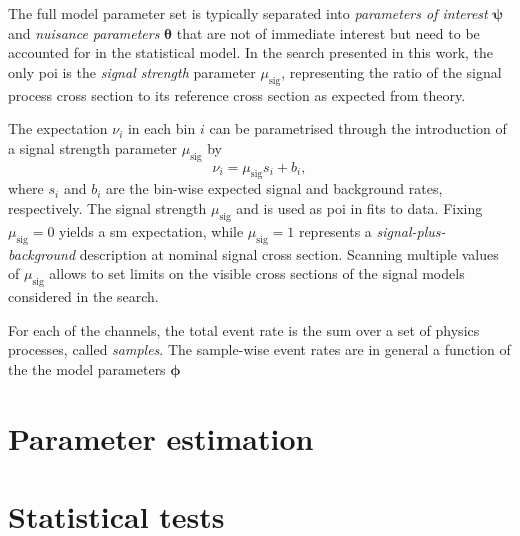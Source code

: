 


 The full model parameter set is typically separated into \textit{parameters of interest} $\boldsymbol{\psi}$ and \textit{nuisance parameters} $\boldsymbol{\theta}$ that are not of immediate interest but need to be accounted for in the statistical model. In the search presented in this work, the only \gls{poi} is the \textit{signal strength} parameter $\mu_{\mathrm{sig}}$, representing the ratio of the signal process cross section to its reference cross section as expected from theory.


The expectation $\nu_i$ in each bin $i$ can be parametrised through the introduction of a signal strength parameter $\mu_{\mathrm{sig}}$ by
\begin{equation}
	\nu_i = \mu_{\mathrm{sig}}s_i + b_i,
\end{equation}
where $s_i$ and $b_i$ are the bin-wise expected signal and background rates, respectively. The signal strength $\mu_{\mathrm{sig}}$ and is used as \gls{poi} in fits to data. Fixing $\mu_{\mathrm{sig}} = 0$ yields a \gls{sm} expectation, while $\mu_{\mathrm{sig}} = 1$ represents a \textit{signal-plus-background} description at nominal signal cross section. Scanning multiple values of $\mu_{\mathrm{sig}}$ allows to set limits on the visible cross sections of the signal models considered in the search. 
  
For each of the channels, the total event rate is the sum over a set of physics processes, called \textit{samples}. The sample-wise event rates are in general a function of the the model parameters $\boldsymbol{\phi}$




\section{Parameter estimation}

\section{Statistical tests}